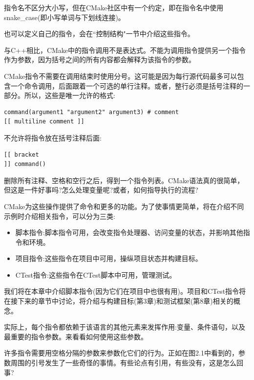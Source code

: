 指令名不区分大小写，但在CMake社区中有一个约定，即在指令名中使用snake\_case(即小写单词与下划线连接)。

也可以定义自己的指令，会在“控制结构"一节中介绍这些指令。

与C++相比，CMake中的指令调用不是表达式。不能为调用指令提供另一个指令作为参数，因为括号之间的所有内容都会解释为该指令的参数。

CMake指令不需要在调用结束时使用分号。这可能是因为每行源代码最多可以包含一个命令调用，后面跟着一个可选的单行注释。或者，整行必须是括号注释的一部分。所以，这些是唯一允许的格式:

\begin{lstlisting}[style=styleCMake]	
command(argument1 "argument2" argument3) # comment
[[ multiline comment ]]
\end{lstlisting}

不允许将指令放在括号注释后面:

\begin{lstlisting}[style=styleCMake]	
[[ bracket
]] command()
\end{lstlisting}

删除所有注释、空格和空行之后，得到一个指令列表。CMake语法真的很简单，但这是一件好事吗?怎么处理变量呢?或者，如何指导执行的流程?

CMake为这些操作提供了命令和更多的功能。为了使事情更简单，将在介绍不同示例时介绍相关指令，可以分为三类:

\begin{itemize}
\item 
脚本指令:脚本指令可用，会改变指令处理器、访问变量的状态，并影响其他指令和环境。

\item 
项目指令:这些指令在项目中可用，操纵项目状态并构建目标。

\item 
CTest指令:这些指令在CTest脚本中可用，管理测试。
\end{itemize}

我们将在本章中介绍脚本指令(因为它们在项目中也很有用)。项目和CTest指令将在接下来的章节中讨论，将介绍与构建目标(第3章)和测试框架(第8章)相关的概念。

实际上，每个指令都依赖于该语言的其他元素来发挥作用:变量、条件语句，以及最重要的指令参数。来看看如何使用这些参数。


许多指令需要用空格分隔的参数来参数化它们的行为。正如在图2.1中看到的，参数周围的引号发生了一些奇怪的事情。有些论点有引用，有些没有，这是怎么回事?

